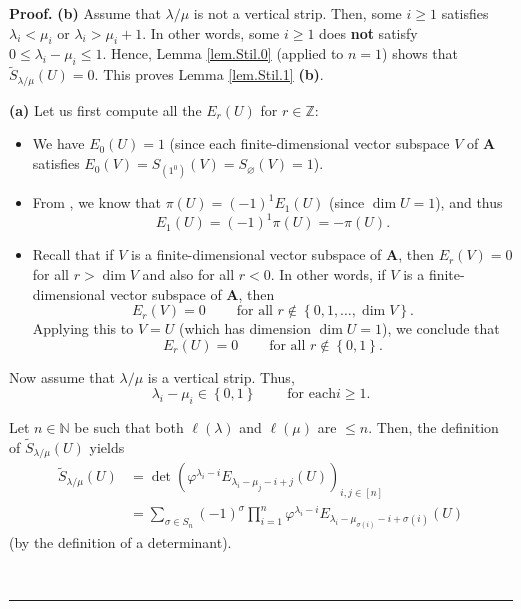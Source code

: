 \documentclass[numbers=enddot,12pt,final,onecolumn,notitlepage]{scrartcl}%
\numberwithin{exer}{section}
\theoremstyle{definition}
\newenvironment{proof}[1][Proof]{\noindent\textbf{#1.} }{\ \rule{0.5em}{0.5em}}
\let\sumnonlimits\sum
\let\prodnonlimits\prod
\renewcommand{\sum}{\sumnonlimits\limits}
\renewcommand{\prod}{\prodnonlimits\limits}
\theoremstyle{plainsl}
\begin{document}
\begin{proof}
\textbf{(b)} Assume that $\lambda/\mu$ is not a vertical strip. Then, some
$i\geq1$ satisfies $\lambda_{i}<\mu_{i}$ or $\lambda_{i}>\mu_{i}+1$. In other
words, some $i\geq1$ does \textbf{not} satisfy $0\leq\lambda_{i}-\mu_{i}\leq
1$. Hence, Lemma \ref{lem.Stil.0} (applied to $n=1$) shows that $\widetilde{S}%
_{\lambda/\mu}\left(  U\right)  =0$. This proves Lemma \ref{lem.Stil.1}
\textbf{(b)}. \medskip

\textbf{(a)} Let us first compute all the $E_{r}\left(  U\right)  $ for
$r\in\mathbb{Z}$:

\begin{itemize}
\item We have $E_{0}\left(  U\right)  =1$ (since each finite-dimensional
vector subspace $V$ of $\mathbf{A}$ satisfies $E_{0}\left(  V\right)
=S_{\left(  1^{0}\right)  }\left(  V\right)  =S_{\varnothing}\left(  V\right)
=1$).

\item From \cite[(7.20)]{Macdon92}, we know that $\pi\left(  U\right)
=\left(  -1\right)  ^{1}E_{1}\left(  U\right)  $ (since $\dim U=1$), and thus%
\[
E_{1}\left(  U\right)  =\left(  -1\right)  ^{1}\pi\left(  U\right)
=-\pi\left(  U\right)  .
\]


\item Recall that if $V$ is a finite-dimensional vector subspace of
$\mathbf{A}$, then $E_{r}\left(  V\right)  =0$ for all $r>\dim V$ and also for
all $r<0$. In other words, if $V$ is a finite-dimensional vector subspace of
$\mathbf{A}$, then%
\[
E_{r}\left(  V\right)  =0\ \ \ \ \ \ \ \ \ \ \text{for all }r\notin\left\{
0,1,\ldots,\dim V\right\}  .
\]
Applying this to $V=U$ (which has dimension $\dim U=1$), we conclude that
\begin{equation}
E_{r}\left(  U\right)  =0\ \ \ \ \ \ \ \ \ \ \text{for all }r\notin\left\{
0,1\right\}  . \label{eq.ErU=0}%
\end{equation}

\end{itemize}

Now assume that $\lambda/\mu$ is a vertical strip. Thus,%
\begin{equation}
\lambda_{i}-\mu_{i}\in\left\{  0,1\right\}  \ \ \ \ \ \ \ \ \ \ \text{for each
}i\geq1. \label{pf.eq.Stilde.1-dim.vs}%
\end{equation}


Let $n\in\mathbb{N}$ be such that both $\ell\left(  \lambda\right)  $ and
$\ell\left(  \mu\right)  $ are $\leq n$. Then, the definition of
$\widetilde{S}_{\lambda/\mu}\left(  U\right)  $ yields%
\begin{align}
\widetilde{S}_{\lambda/\mu}\left(  U\right)   &  =\det\left(  \varphi
^{\lambda_{i}-i}E_{\lambda_{i}-\mu_{j}-i+j}\left(  U\right)  \right)
_{i,j\in\left[  n\right]  }\nonumber\\
&  =\sum_{\sigma\in S_{n}}\left(  -1\right)  ^{\sigma}\prod_{i=1}^{n}%
\varphi^{\lambda_{i}-i}E_{\lambda_{i}-\mu_{\sigma\left(  i\right)  }%
-i+\sigma\left(  i\right)  }\left(  U\right)  \label{pf.eq.Stilde.1-dim.3}%
\end{align}
(by the definition of a determinant).


\end{proof}
\end{document}
